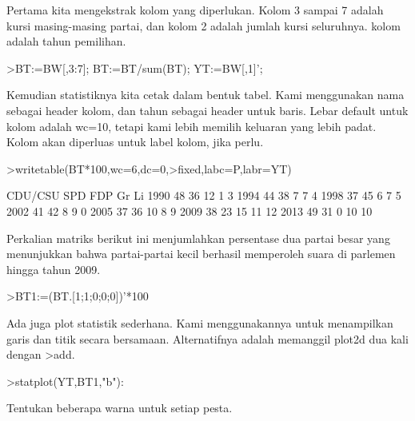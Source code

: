 \documentclass[a4paper,10pt]{article}
\begin{document}
\begin{eulernotebook}
\begin{eulercomment}
\begin{eulercomment}
\begin{eulercomment}
Pertama kita mengekstrak kolom yang diperlukan. Kolom 3 sampai 7
adalah kursi masing-masing partai, dan kolom 2 adalah jumlah kursi
seluruhnya. kolom adalah tahun pemilihan.
\end{eulercomment}
\begin{eulerprompt}
>BT:=BW[,3:7]; BT:=BT/sum(BT); YT:=BW[,1]';
\end{eulerprompt}
\begin{eulercomment}
Kemudian statistiknya kita cetak dalam bentuk tabel. Kami menggunakan
nama sebagai header kolom, dan tahun sebagai header untuk baris. Lebar
default untuk kolom adalah wc=10, tetapi kami lebih memilih keluaran
yang lebih padat. Kolom akan diperluas untuk label kolom, jika perlu.
\end{eulercomment}
\begin{eulerprompt}
>writetable(BT*100,wc=6,dc=0,>fixed,labc=P,labr=YT)
\end{eulerprompt}
\begin{euleroutput}
         CDU/CSU   SPD   FDP    Gr    Li
    1990      48    36    12     1     3
    1994      44    38     7     7     4
    1998      37    45     6     7     5
    2002      41    42     8     9     0
    2005      37    36    10     8     9
    2009      38    23    15    11    12
    2013      49    31     0    10    10
\end{euleroutput}
\begin{eulercomment}
Perkalian matriks berikut ini menjumlahkan persentase dua partai besar
yang menunjukkan bahwa partai-partai kecil berhasil memperoleh suara
di parlemen hingga tahun 2009.
\end{eulercomment}
\begin{eulerprompt}
>BT1:=(BT.[1;1;0;0;0])'*100
\end{eulerprompt}
\begin{euleroutput}
  [84.29,  81.25,  81.1659,  82.7529,  72.9642,  61.8971,  79.8732]
\end{euleroutput}
\begin{eulercomment}
Ada juga plot statistik sederhana. Kami menggunakannya untuk
menampilkan garis dan titik secara bersamaan. Alternatifnya adalah
memanggil plot2d dua kali dengan \textgreater{}add.
\end{eulercomment}
\begin{eulerprompt}
>statplot(YT,BT1,"b"):
\end{eulerprompt}
\begin{eulercomment}
Tentukan beberapa warna untuk setiap pesta.
\end{eulercomment}

\end{eulercomment}
\end{eulercomment}
\end{eulernotebook}
\end{document}
